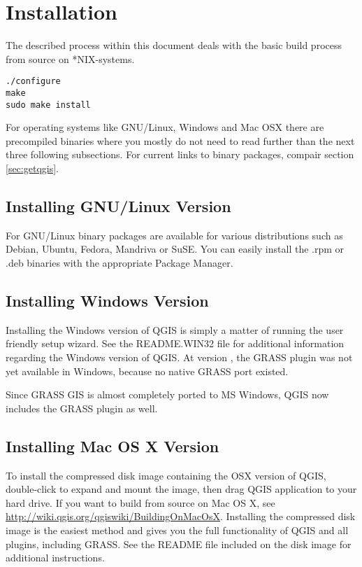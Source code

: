 
\section{Installation}\label{label_installation_source}

The described process within this document deals with the basic build
process from source on *NIX-systems.
\begin{verbatim}
./configure
make
sudo make install
\end{verbatim}

For operating systems like GNU/Linux, Windows and Mac OSX there are precompiled binaries 
where you mostly do not need to read further than the next three following subsections. For 
current links to binary packages, compair section \ref{sec:getqgis}.

\subsection{Installing GNU/Linux Version}
For GNU/Linux binary packages are available for various distributions such as Debian, Ubuntu, 
Fedora, Mandriva or SuSE. You can easily install the .rpm or .deb binaries with the 
appropriate Package Manager.

\subsection{Installing Windows Version}
Installing the Windows version of QGIS is simply a matter of running the
user friendly setup wizard. See the README.WIN32 file for additional
information regarding the Windows version of QGIS. At version \OLD, the
GRASS plugin was not yet available in Windows, because no native GRASS
port existed.

Since GRASS GIS is almost completely ported to MS Windows, QGIS \CURRENT now 
includes the GRASS plugin as well.

\subsection{Installing Mac OS X Version}
To install the compressed disk image containing the OSX version of QGIS,
double-click to expand and mount the image, then drag QGIS application to
your hard drive. If you want to build from source on Mac OS X, see
\url{http://wiki.qgis.org/qgiswiki/BuildingOnMacOsX}.
Installing the
compressed disk image is the easiest method and gives you the full
functionality of QGIS and all plugins, including GRASS. See the README file
included on the disk image for additional instructions.

